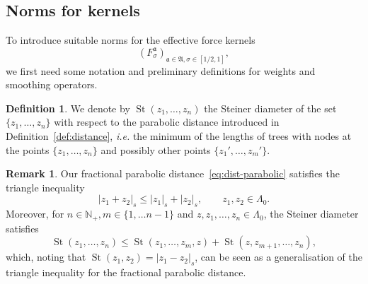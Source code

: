 \documentclass{article}
\numberwithin{equation}{section}
\theoremstyle{plain}
\theoremstyle{definition}
\newtheorem{definition}[theorem]{Definition}
\newtheorem{remark}[theorem]{Remark}
\begin{document}
\subsection{Norms for kernels}

To introduce suitable norms for the effective force kernels
\[ (F_{\sigma}^{\mathfrak{a}})_{\mathfrak{a} \in \mathfrak{A}, \sigma \in [1 /
   2, 1]}, \]
we first need some notation and preliminary definitions for weights and
smoothing operators.

\begin{definition}
  We denote by $\operatorname{St} (z_1, \ldots, z_n)$ the Steiner diameter of the set
  $\{ z_1, \ldots, z_n \}$ with respect to the parabolic distance introduced
  in Definition~\ref{def:distance}, \textit{i.e.} the minimum of the
  lengths of trees with nodes at the points $\{ z_1, \ldots, z_n \}$ and
  possibly other points $\{ z_1', \ldots, z_m' \}$.
\end{definition}

\begin{remark}
  \label{rem:steiner}Our fractional parabolic
  distance~\eqref{eq:dist-parabolic} satisfies the triangle inequality
  \[ | z_1 + z_2 |_s \leqslant | z_1 |_s + | z_2 |_s, \qquad z_1, z_2 \in
     \Lambda_0 . \]
  Moreover, for $n \in \mathbb{N}_+, m \in \{ 1, \ldots n - 1 \}$ and $z, z_1,
  \ldots, z_n \in \Lambda_0$, the Steiner diameter satisfies
  \[ \operatorname{St} (z_1, \ldots, z_n) \leqslant \operatorname{St} (z_1, \ldots, z_m, z) +
     \operatorname{St} (z, z_{m + 1}, \ldots, z_n), \]
  which, noting that $\operatorname{St} (z_1, z_2) = | z_1 - z_2 |_s$, can be seen as
  a generalisation of the triangle inequality for the fractional parabolic
  distance.
\end{remark}
\end{document}

